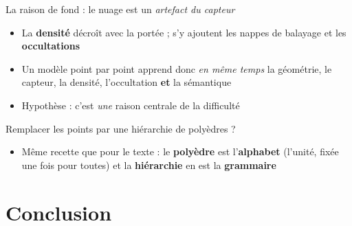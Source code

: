 \documentclass[A4,svgnames,9pt,aspectratio=169]{beamer}
\begin{document}
\begin{frame}{La raison de fond : le nuage est un \emph{artefact du capteur}}
    \begin{center}
        \resizebox{0.72\textwidth}{!}{}
    \end{center}

    \vspace{0.15cm}
    \small
    \begin{itemize}
        \setlength{\itemsep}{5pt}
        \item La \textbf{densité} décroît avec la portée ; s'y ajoutent les nappes de balayage
        et les \textbf{occultations}
        \item Un modèle point par point apprend donc \emph{en même temps} la géométrie, le capteur,
        la densité, l'occultation \textbf{et} la sémantique
        \item Hypothèse : c'est \emph{une} raison centrale de la difficulté
    \end{itemize}
\end{frame}

\begin{frame}{Remplacer les points par une hiérarchie de \textcolor{inria-rouge}{polyèdres} ?}
    \vspace{-0.10cm}
    \begin{center}
        \resizebox{0.54\textwidth}{!}{}
    \end{center}

    \vspace{0.26cm}
    \small
    \begin{itemize}
        \item Même recette que pour le texte : le \textbf{polyèdre} est l'\textbf{alphabet}
        (l'unité, fixée une fois pour toutes) et la \textbf{hiérarchie} en est la
        \textbf{grammaire}
    \end{itemize}
\end{frame}

\section{Conclusion}
\frame{\sectionpage}
\end{document}
